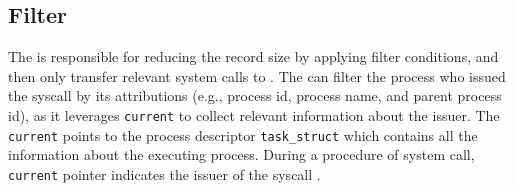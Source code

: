 







\subsection{Filter}

The \Filter is responsible for reducing the record size by applying filter conditions, and then only  transfer relevant system calls to \RecordBuffer.
The \Filter can filter the process who issued the syscall by its attributions (e.g., process id, process name, and parent process id), as it leverages \texttt{current} to collect relevant information about the issuer. The \texttt{current} points to the process descriptor \texttt{task\_struct} which contains all the information about the executing process. During a procedure of system call, \texttt{current} pointer indicates the issuer of the syscall \cite{corbet_linux_2005}. 


